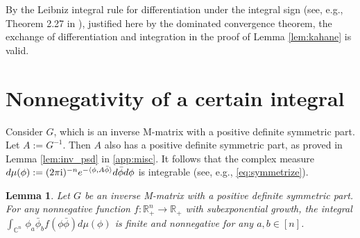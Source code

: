 \documentclass[a4paper, 11pt]{article}
\newcommand{\compi}{\textnormal{i}}
\newtheorem{lem}[thm]{Lemma}
\begin{document}
By the Leibniz integral rule for differentiation under the integral sign (see, e.g., Theorem 2.27 in \cite{fo99}), justified here by the dominated convergence theorem, the exchange of differentiation and integration in the proof of Lemma \ref{lem:kahane} is valid.

\section{Nonnegativity of a certain integral}
\label{apx:sec2}

Consider $G$, which is an inverse M-matrix with a positive definite symmetric part. Let $A:=G^{-1}$. Then $A$ also has a positive definite symmetric part, as proved in Lemma \ref{lem:inv_psd} in \cref{app:misc}. It follows that the complex measure $d\mu(\phi):=(2\pi\compi)^{-n}e^{-\langle \phi, A\bar{\phi}\rangle} d\bar{\phi}d\phi$ is integrable (see, e.g., \cref{eq:symmetrize}).

\vspace{.3em} \begin{lem}
\label{lem:nonneg}
Let $G$ be an inverse M-matrix with a positive definite symmetric part. For any nonnegative function $f:\mathbb{R}_+^n\rightarrow \mathbb{R}_+$ with subexponential growth, the integral $\int_{\mathbb{C}^n}\, \phi_a\bar{\phi}_b f(\phi\bar{\phi}) d\mu(\phi)$ is finite and nonnegative for any $a,b\in [n]$.
\end{lem}
\end{document}
